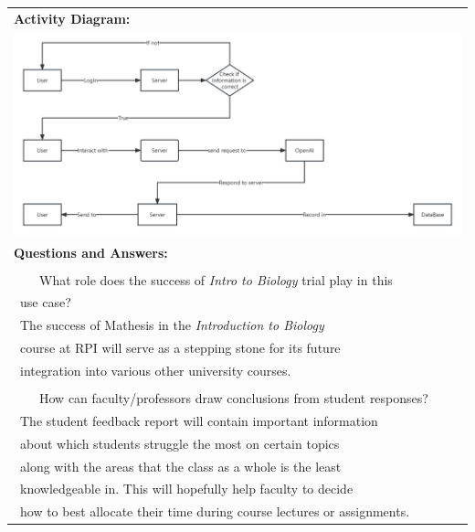 \documentclass[12pt,a4paper]{article}
\newcommand{\tabitem}{\\~~\llap{\textbullet}~~}
\begin{document}
\begin{appendices}
\begin{table}[H]
\begin{tabular}{|p{13cm}|}
        \end{tabular}
        \end{table}

        \begin{table}[H]
        \label{tab:useCaseDoc3}
        \centering
        \def\arraystretch{1.4}
        \begin{tabular}{|p{13cm}|}
            \hline

            \textbf{Activity Diagram:}\\

            \includegraphics[width=\linewidth]{images/activityDiagram}\\\hline

            \textbf{Questions and Answers:} \\\makecell[l]{
                \tabitem What role does the success of \textit{Intro to Biology} trial play in this
                    \\\quad~use case?
                    \\\quad~The success of Mathesis in the \textit{Introduction to Biology}
                    \\\quad~course at RPI will serve as a stepping stone for its future
                    \\\quad~integration into various other university courses.\\
                \tabitem How can faculty/professors draw conclusions from student responses?
                    \\\quad~The student feedback report will contain important information
                    \\\quad~about which students struggle the most on certain topics
                    \\\quad~along with the areas that the class as a whole is the least
                    \\\quad~knowledgeable in.  This will hopefully help faculty to decide
                    \\\quad~how to best allocate their time during course lectures or assignments.
            }\\\hline
        \end{tabular}
        \end{table}

    \end{appendices}
\end{document}
